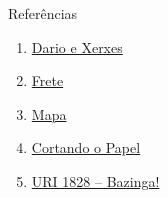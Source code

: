 \begin{frame}[fragile]{Referências}

    \begin{enumerate}
        \item \href{https://olimpiada.ic.unicamp.br/pratique/pu/2017/f2/xerxes/}{Dario e Xerxes} 
 
        \item \href{https://olimpiada.ic.unicamp.br/pratique/pu/2017/f2/frete/}{Frete}
 
        \item \href{https://olimpiada.ic.unicamp.br/pratique/pu/2017/f2/mapa/}{Mapa}

        \item \href{https://olimpiada.ic.unicamp.br/pratique/pu/2017/f2/papel/}{Cortando o Papel}

        \item \href{https://www.urionlinejudge.com.br/judge/en/problems/view/1828}{URI 1828 --
            Bazinga!}
 
    \end{enumerate}

\end{frame}
